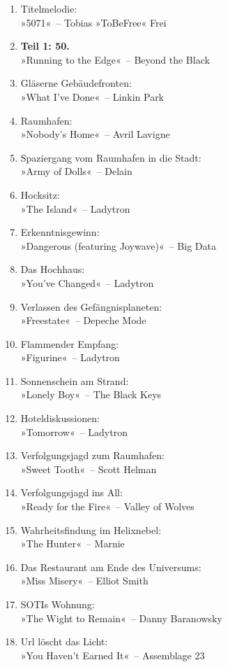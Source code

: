 \begin{enumerate}
    \item Titelmelodie:\\ »5071«~– Tobias »ToBeFree« Frei
    \item \textbf{Teil 1: 50.}\\ »Running to the Edge«~– Beyond the Black
    \item Gläserne Gebäudefronten:\\ »What I’ve Done«~– Linkin Park
    \item Raumhafen:\\ »Nobody’s Home«~– Avril Lavigne
    \item Spaziergang vom Raumhafen in die Stadt:\\ »Army of Dolls«~– Delain
    \item Hocksitz:\\ »The Island«~– Ladytron
    \item Erkenntnisgewinn:\\ »Dangerous (featuring Joywave)«~– Big Data
    \item Das Hochhaus:\\ »You’ve Changed«~– Ladytron
    \item Verlassen des Gefängnisplaneten:\\ »Freestate«~– Depeche Mode
    \item Flammender Empfang:\\ »Figurine«~– Ladytron
    \item Sonnenschein am Strand:\\ »Lonely Boy«~– The Black Keys
    \item Hoteldiskussionen:\\ »Tomorrow«~– Ladytron
    \item Verfolgungsjagd zum Raumhafen:\\ »Sweet Tooth«~– Scott Helman
    \item Verfolgungsjagd ins All:\\ »Ready for the Fire«~– Valley of Wolves
    \item Wahrheitsfindung im Helixnebel:\\ »The Hunter«~– Marnie
    \item Das Restaurant am Ende des Universums:\\ »Miss Misery«~– Elliot Smith
    \item SOTIs Wohnung:\\ »The Wight to Remain«~– Danny Baranowsky
    \item Url löscht das Licht:\\ »You Haven’t Earned It«~– Assemblage 23

\end{enumerate}
